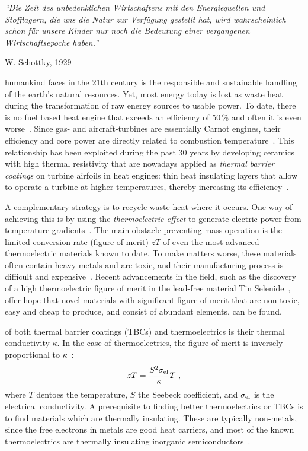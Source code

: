 \epigraph{\singlespacing \it ``Die Zeit des unbedenklichen Wirtschaftens mit den Energiequellen und Stofflagern, die uns die Natur zur Verfügung gestellt hat, wird wahrscheinlich schon für unsere Kinder nur noch die Bedeutung einer vergangenen Wirtschaftsepoche haben.''}{W. Schottky, 1929~\cite{Schottky1929}}
 humankind faces in the 21th century is the responsible and sustainable handling of the earth's natural resources.  Yet, most energy today is lost as waste heat during the transformation of raw energy sources to usable power. To date, there is no fuel based heat engine that exceeds an efficiency of 50\,\% and often it is even worse~\cite{eia}. 
Since gas- and aircraft-turbines are essentially Carnot engines, their efficiency and core power are directly related to combustion temperature~\cite{Clarke.2012,Perepezko.2009}. This relationship has been exploited during the past 30 years by developing 
ceramics with high thermal resistivity that are nowadays applied as \emph{thermal barrier coatings} on turbine airfoils in heat engines: thin heat insulating layers that allow to operate a turbine at higher temperatures, thereby increasing its efficiency~\cite{Clarke.2003}.

A complementary strategy is to recycle waste heat where it occurs. One way of achieving this is by using the \emph{thermoelectric effect} to  generate electric power from temperature gradients~\cite{Snyder.2008}. The main obstacle preventing mass operation is the limited conversion rate (figure of merit) $zT$ of even the most advanced thermoelectric materials known to date. To make matters worse, these materials often contain heavy metals and are toxic, 
and their manufacturing process is difficult and expensive~\cite{Nolas2001}. Recent advancements in the field, such as the discovery of a high thermoelectric figure of merit in the lead-free material Tin Selenide~\cite{Zhao.2014}, offer hope that novel materials with significant figure of merit that are non-toxic, easy and cheap to produce, and consist of abundant elements, can be found.

 of both thermal barrier coatings (TBCs) and thermoelectrics is their thermal conductivity $\kappa$. In the case of thermoelectrics, the figure of merit is inversely proportional to $\kappa$~\cite{Nolas2001}:
\begin{align}
zT = \frac{S^2 \sigma_{\rm el}}{\kappa} T~,
\label{eq:zT}
\end{align} 
where $T$ dentoes the temperature, $S$ the Seebeck coefficient, and $\sigma_{\rm el}$ is the electrical conductivity.
A prerequisite to finding better thermoelectrics or TBCs is to find materials which are thermally insulating. These are typically non-metals, since the free electrons in metals are good heat carriers, and most of the known thermoelectrics are thermally insulating inorganic semiconductors~\cite[p.\,15]{Nolas2001}.

